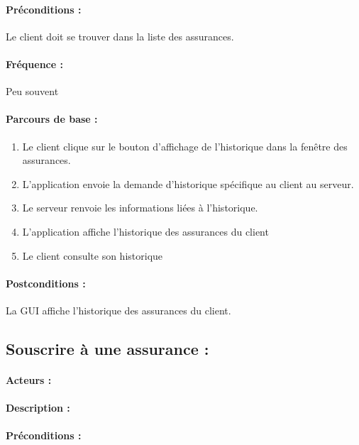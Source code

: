 \documentclass[../annexe.tex]{subfiles}
\begin{document}
\paragraph{Préconditions :} Le client doit se trouver dans la liste des assurances.

\paragraph{Fréquence :} Peu souvent 

\paragraph{Parcours de base :} 

	\begin{enumerate}
		\item Le client clique sur le bouton d'affichage de l'historique dans la fenêtre des assurances.
		\item L'application envoie la demande d'historique spécifique au client au serveur.
		\item Le serveur renvoie les informations liées à l'historique.
		\item L'application affiche l'historique des assurances du client
		\item Le client consulte son historique 
	\end{enumerate}

\paragraph{Postconditions :} La GUI affiche l'historique des assurances du client.

\newpage

\subsection{Souscrire à une assurance :}

\paragraph{Acteurs :}

\paragraph{Description :}

\paragraph{Préconditions :}
\end{document}
